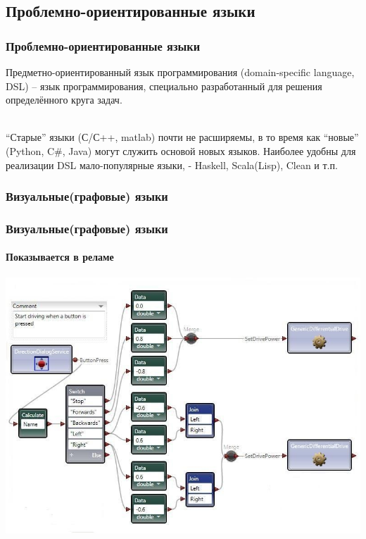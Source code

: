 \documentclass{beamer}
\begin{document}
\subsection{Проблемно-ориентированные языки}
\begin{frame}
\frametitle{Проблемно-ориентированные языки}
Предметно-ориентированный язык программирования (domain-specific language, DSL)
-- язык программирования, специально разработанный для решения определённого
круга задач.

\\

``Старые'' языки (С/С++, matlab) почти не расширяемы, в то время как ``новые''
(Python, C#, Java) могут служить основой новых языков. Наиболее удобны для
реализации DSL мало-популярные языки, - Haskell, Scala(Lisp), Clean и т.п.

\end{frame}


\subsubsection{Визуальные(графовые) языки}
\begin{frame}
\frametitle{Визуальные(графовые) языки}
\framesubtitle{Показывается в реламе}
\includegraphics[scale=0.4]{rs.jpg}
\end{frame}
\end{document}
